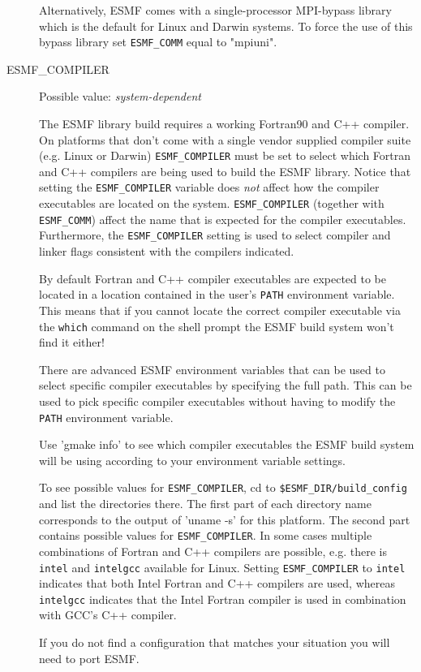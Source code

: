 \begin{description}
Alternatively, ESMF comes with a single-processor MPI-bypass library which is
the default for Linux and Darwin systems. To force the use of this bypass
library set {\tt ESMF\_COMM} equal to "mpiuni".

\item[ESMF\_COMPILER]
Possible value: {\em system-dependent}

The ESMF library build requires a working Fortran90 and C++ compiler. On 
platforms that don't come with a single vendor supplied compiler suite
(e.g. Linux or Darwin) {\tt ESMF\_COMPILER} must be set to select which Fortran
and C++ compilers are being used to build the ESMF library. Notice that setting
the {\tt ESMF\_COMPILER} variable does {\em not} affect how the compiler
executables are located on the system. {\tt ESMF\_COMPILER} (together with
{\tt ESMF\_COMM}) affect the name that is expected for the compiler executables.
Furthermore, the {\tt ESMF\_COMPILER} setting is used to select compiler and
linker flags consistent with the compilers indicated.

By default Fortran and C++ compiler executables are expected to be located in
a location contained in the user's {\tt PATH} environment variable. This means
that if you cannot locate the correct compiler executable via the {\tt which}
command on the shell prompt the ESMF build system won't find it either!

There are advanced ESMF environment variables that can be used to select 
specific compiler executables by specifying the full path. This can be used to
pick specific compiler executables without having to modify the {\tt PATH}
environment variable.

Use 'gmake info' to see which compiler executables the ESMF build system will
be using according to your environment variable settings.

To see possible values for {\tt ESMF\_COMPILER}, cd to 
{\tt \$ESMF\_DIR/build\_config} and list the directories there. The first part 
of each directory name corresponds to the output of 'uname -s' for this 
platform. The second part contains possible values for {\tt ESMF\_COMPILER}. In
some cases multiple combinations of Fortran and C++ compilers are possible, e.g.
there is {\tt intel} and {\tt intelgcc} available for Linux. Setting 
{\tt ESMF\_COMPILER} to {\tt intel} indicates that both Intel Fortran and 
C++ compilers are used, whereas {\tt intelgcc} indicates that the Intel Fortran
compiler is used in combination with GCC's C++ compiler.

If you do not find a configuration that matches your situation you will need to
port ESMF.


\end{description}
